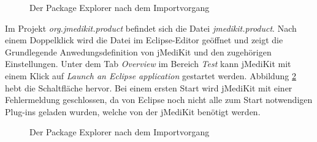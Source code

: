 \begin{figure}[H]
  \vspace{0.5cm}
  \centering
  \caption{Der Package Explorer nach dem Importvorgang}
  \label{finishedimport}
  \vspace{0.5cm}
\end{figure}

Im Projekt \textit{org.jmedikit.product} befindet sich die Datei \textit{jmedikit.product}. Nach einem Doppelklick wird die Datei im Eclipse-Editor geöffnet und zeigt die Grundlegende Anwedungsdefinition von jMediKit und den zugehörigen Einstellungen. Unter dem Tab \textit{Overview} im Bereich \textit{Test} kann jMediKit mit einem Klick auf \textit{Launch an Eclipse application} gestartet werden. Abbildung \ref{launchjmedikit} hebt die Schaltfläche hervor. Bei einem ersten Start wird jMediKit mit einer Fehlermeldung geschlossen, da von Eclipse noch nicht alle zum Start notwendigen Plug-ins geladen wurden, welche von der jMediKit benötigt werden.

\begin{figure}[H]
  \vspace{0.5cm}
  \centering
  \caption{Der Package Explorer nach dem Importvorgang}
  \label{launchjmedikit}
  \vspace{0.5cm}
\end{figure}

